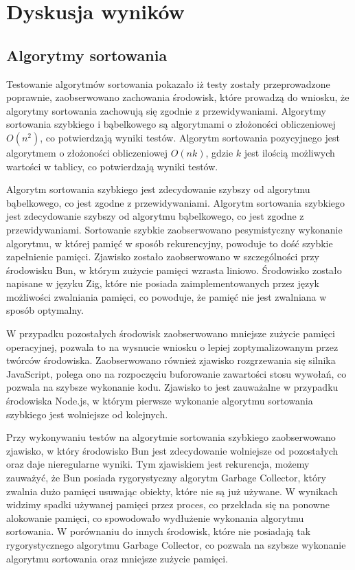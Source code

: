 \section{Dyskusja wyników}
\subsection{Algorytmy sortowania}
Testowanie algorytmów sortowania pokazało iż testy zostały przeprowadzone poprawnie, zaobserwowano zachowania środowisk, które prowadzą do wniosku, że algorytmy sortowania zachowują się zgodnie z przewidywaniami. Algorytmy sortowania szybkiego i bąbelkowego są algorytmami o złożoności obliczeniowej $O(n^2)$, co potwierdzają wyniki testów. Algorytm sortowania pozycyjnego jest algorytmem o złożoności obliczeniowej $O(nk)$, gdzie $k$ jest ilością możliwych wartości w tablicy, co potwierdzają wyniki testów.

Algorytm sortowania szybkiego jest zdecydowanie szybszy od algorytmu bąbelkowego, co jest zgodne z przewidywaniami. Algorytm sortowania szybkiego jest zdecydowanie szybszy od algorytmu bąbelkowego, co jest zgodne z przewidywaniami. Sortowanie szybkie zaobserwowano pesymistyczny wykonanie algorytmu, w której pamięć w sposób rekurencyjny, powoduje to dość szybkie zapełnienie pamięci. Zjawisko zostało zaobserwowano w szczególności przy środowisku Bun, w którym zużycie pamięci wzrasta liniowo. Środowisko zostało napisane w języku Zig, które nie posiada zaimplementowanych przez język możliwości zwalniania pamięci, co powoduje, że pamięć nie jest zwalniana w sposób optymalny. 

W przypadku pozostałych środowisk zaobserwowano mniejsze zużycie pamięci operacyjnej, pozwala to na wysnucie wniosku o lepiej zoptymalizowanym przez twórców środowiska. Zaobserwowano również zjawisko rozgrzewania się silnika JavaScript, polega ono na rozpoczęciu buforowanie zawartości stosu wywołań, co pozwala na szybsze wykonanie kodu. Zjawisko to jest zauważalne w przypadku środowiska Node.js, w którym pierwsze wykonanie algorytmu sortowania szybkiego jest wolniejsze od kolejnych.

Przy wykonywaniu testów na algorytmie sortowania szybkiego zaobserwowano zjawisko, w który środowisko Bun jest zdecydowanie wolniejsze od pozostałych oraz daje nieregularne wyniki. Tym zjawiskiem jest rekurencja, możemy zauważyć, że Bun posiada rygorystyczny algorytm Garbage Collector, który zwalnia dużo pamięci usuwając obiekty, które nie są już używane. W wynikach widzimy spadki używanej pamięci przez proces, co przekłada się na ponowne alokowanie pamięci, co spowodowało wydłużenie wykonania algorytmu sortowania. W porównaniu do innych środowisk, które nie posiadają tak rygorystycznego algorytmu Garbage Collector, co pozwala na szybsze wykonanie algorytmu sortowania oraz mniejsze zużycie pamięci. 

